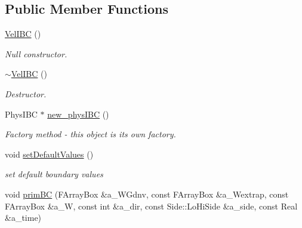 \subsection*{Public Member Functions}
\begin{DoxyCompactItemize}
\item 
\hypertarget{class_vel_i_b_c_a5823ec0d34fc039346f6f5970ac20393}{\hyperlink{class_vel_i_b_c_a5823ec0d34fc039346f6f5970ac20393}{Vel\-I\-B\-C} ()}\label{class_vel_i_b_c_a5823ec0d34fc039346f6f5970ac20393}

\begin{DoxyCompactList}\small\item\em Null constructor. \end{DoxyCompactList}\item 
\hypertarget{class_vel_i_b_c_a4b4e45d8bcd831ee73e360ca953fc3e3}{\hyperlink{class_vel_i_b_c_a4b4e45d8bcd831ee73e360ca953fc3e3}{$\sim$\-Vel\-I\-B\-C} ()}\label{class_vel_i_b_c_a4b4e45d8bcd831ee73e360ca953fc3e3}

\begin{DoxyCompactList}\small\item\em Destructor. \end{DoxyCompactList}\item 
Phys\-I\-B\-C $\ast$ \hyperlink{class_vel_i_b_c_ac53daf9706542e3fa4734c8701f5fff5}{new\-\_\-phys\-I\-B\-C} ()
\begin{DoxyCompactList}\small\item\em Factory method -\/ this object is its own factory. \end{DoxyCompactList}\item 
\hypertarget{class_vel_i_b_c_a67c793da1efebd887de7b0c7907b7e5b}{void \hyperlink{class_vel_i_b_c_a67c793da1efebd887de7b0c7907b7e5b}{set\-Default\-Values} ()}\label{class_vel_i_b_c_a67c793da1efebd887de7b0c7907b7e5b}

\begin{DoxyCompactList}\small\item\em set default boundary values \end{DoxyCompactList}\item 
\hypertarget{class_vel_i_b_c_a30d5d96e3f384b7fa82d919a424c7847}{void \hyperlink{class_vel_i_b_c_a30d5d96e3f384b7fa82d919a424c7847}{prim\-B\-C} (F\-Array\-Box \&a\-\_\-\-W\-Gdnv, const F\-Array\-Box \&a\-\_\-\-Wextrap, const F\-Array\-Box \&a\-\_\-\-W, const int \&a\-\_\-dir, const Side\-::\-Lo\-Hi\-Side \&a\-\_\-side, const Real \&a\-\_\-time)}\label{class_vel_i_b_c_a30d5d96e3f384b7fa82d919a424c7847}


\end{DoxyCompactItemize}
